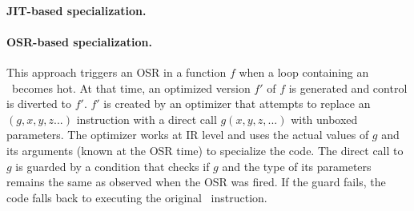 





\ifdefined\fullver
\paragraph{JIT-based specialization.}  

\paragraph{OSR-based specialization.} This approach triggers an OSR in a function $f$ when a loop containing an \feval\ becomes hot. At that time, an optimized version $f'$ of $f$ is generated and control is diverted to $f'$. $f'$ is created by an optimizer that attempts to replace an \feval$(g,x,y,z...)$ instruction with a direct call $g(x,y,z,...)$ with unboxed parameters. The optimizer works at IR level and uses the actual values of $g$ and its arguments (known at the OSR time) to specialize the code. The direct call to $g$ is guarded by a condition that checks if $g$ and the type of its parameters remains the same as observed when the OSR was fired. If the guard fails, the code falls back to executing the original \feval\ instruction.

